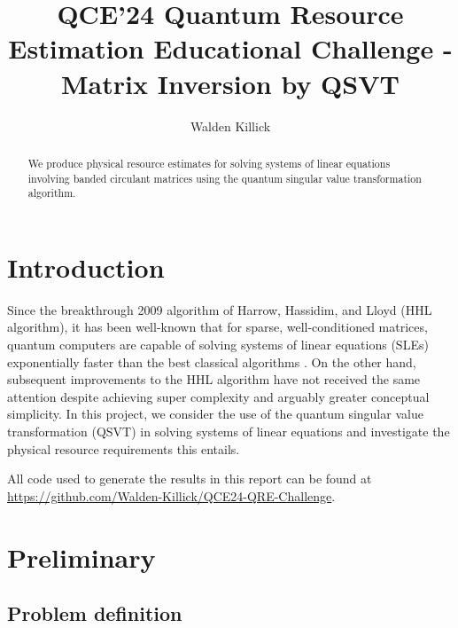 \documentclass[10pt, twocolumn]{article}
\begin{document}
\title{QCE'24 Quantum Resource Estimation Educational Challenge - Matrix Inversion by QSVT}
\author{Walden Killick}

\maketitle

\begin{abstract}
	We produce physical resource estimates for solving systems of linear equations involving banded circulant matrices using the quantum singular value transformation algorithm.
\end{abstract}

\section{Introduction}

Since the breakthrough 2009 algorithm of Harrow, Hassidim, and Lloyd (HHL algorithm), it has been well-known that for sparse, well-conditioned matrices, quantum computers are capable of solving systems of linear equations (SLEs) exponentially faster than the best classical algorithms \cite{harrow2009quantum}. On the other hand, subsequent improvements to the HHL algorithm have not received the same attention despite achieving super complexity and arguably greater conceptual simplicity. In this project, we consider the use of the quantum singular value transformation (QSVT) \cite{gilyen2019quantum, martyn2021grand} in solving systems of linear equations and investigate the physical resource requirements this entails.

All code used to generate the results in this report can  be found at \href{https://github.com/Walden-Killick/QCE24-QRE-Challenge}{https://github.com/Walden-Killick/QCE24-QRE-Challenge}.

\section{Preliminary}

\subsection{Problem definition}
\end{document}
